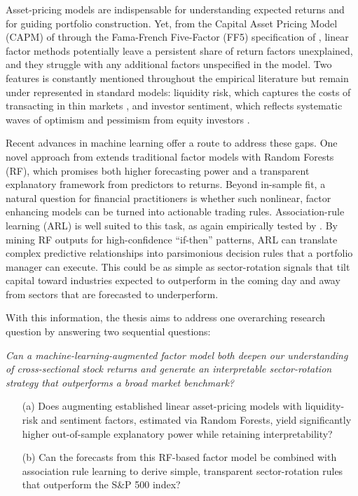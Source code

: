 Asset-pricing models are indispensable for understanding expected returns and for guiding portfolio construction. Yet, from the Capital Asset Pricing Model (CAPM) of  through the Fama-French Five-Factor (FF5) specification of , linear factor methods potentially leave a persistent share of return factors unexplained, and they struggle with any additional factors unspecified in the model. Two features is constantly mentioned throughout the empirical literature but remain under represented in standard models: liquidity risk, which captures the costs of transacting in thin markets \cite{pastor_2003,acharya_2005}, and investor sentiment, which reflects systematic waves of optimism and pessimism from equity investors \cite{baker_wurgler_2006}.

Recent advances in machine learning offer a route to address these gaps. One novel approach from  extends traditional factor models with Random Forests (RF), which promises both higher forecasting power and a transparent explanatory framework from predictors to returns. Beyond in-sample fit, a natural question for financial practitioners is whether such nonlinear, factor enhancing models can be turned into actionable trading rules. Association-rule learning (ARL) is well suited to this task, as again empirically tested by . By mining RF outputs for high-confidence “if-then” patterns, ARL can translate complex predictive relationships into parsimonious decision rules that a portfolio manager can execute. This could be as simple as sector-rotation signals that tilt capital toward industries expected to outperform in the coming day and away from sectors that are forecasted to underperform.

\bigskip
\noindent
With this information, the thesis aims to address one overarching research question by answering two sequential questions:

\textit{Can a machine-learning-augmented factor model both deepen our
understanding of cross-sectional stock returns and generate an
interpretable sector-rotation strategy that outperforms a broad market
benchmark?}

\begin{enumerate}
  \item[(a)]  Does augmenting established linear asset-pricing models with liquidity-risk and sentiment factors, estimated via Random Forests, yield significantly higher out-of-sample explanatory power while retaining interpretability?\\
  \item[(b)] Can the forecasts from this RF-based factor model be combined with association rule learning to derive simple, transparent sector-rotation rules that outperform the S\&P 500 index?\\
\end{enumerate}


